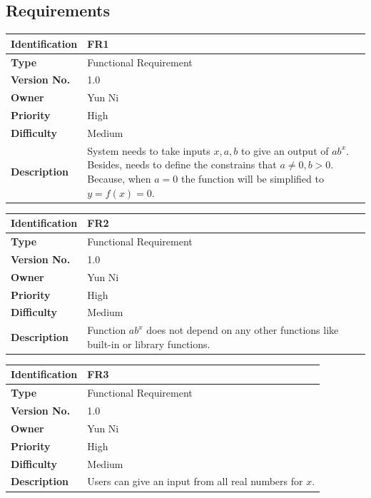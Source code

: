 \documentclass[11pt]{article}
\begin{document}
\subsection{Requirements}
\begin{center}
    \begin{tabular}{|p{3cm}|p{11cm}| }
    \hline
    \textbf{Identification} &  FR1 \\ \hline 
    \textbf{Type} & Functional Requirement\\ \hline
    \textbf{Version No.} &  1.0 \\ \hline 
    \textbf{Owner} &  Yun Ni \\ \hline 
    \textbf{Priority} & High  \\ \hline
    \textbf{Difficulty} & Medium  \\ \hline
    \textbf{Description} & System needs to take inputs $x, a, b$ to give an output of $ab^x$. Besides, needs to define the constrains that $a\neq0, b > 0$. Because, when $a=0$ the function will be simplified to $y = f(x) = 0$. \\ \hline
\end{tabular}
\end{center}

\begin{center}
    \begin{tabular}{|p{3cm}|p{11cm}| }
    \hline
    \textbf{Identification} &  FR2 \\ \hline 
    \textbf{Type} & Functional Requirement\\ \hline 
    \textbf{Version No.} &  1.0 \\ \hline 
    \textbf{Owner} &  Yun Ni \\ \hline 
    \textbf{Priority} & High  \\ \hline
    \textbf{Difficulty} & Medium  \\ \hline
    \textbf{Description} & Function $ab^x$ does not depend on any other functions like built-in or library functions.\\ \hline
\end{tabular}
\end{center}

\begin{center}
    \begin{tabular}{|p{3cm}|p{11cm}| }
    \hline
    \textbf{Identification} &  FR3 \\ \hline 
    \textbf{Type} & Functional Requirement\\ \hline
    \textbf{Version No.} &  1.0 \\ \hline 
    \textbf{Owner} &  Yun Ni \\ \hline 
    \textbf{Priority} & High  \\ \hline
    \textbf{Difficulty} & Medium  \\ \hline
    \textbf{Description} & Users can give an input from all real numbers for $x$.\\ \hline
\end{tabular}
\end{center}
\end{document}
